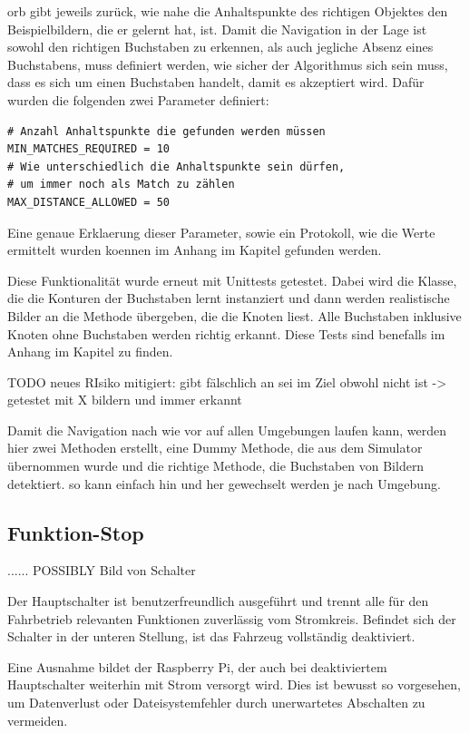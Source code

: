 \acrshort{orb} gibt jeweils zurück, wie nahe die Anhaltspunkte des richtigen Objektes den Beispielbildern, die er gelernt hat, ist. Damit die Navigation in der Lage ist sowohl den richtigen Buchstaben zu erkennen, als auch jegliche Absenz eines Buchstabens, muss definiert werden, wie sicher der Algorithmus sich sein muss, dass es sich um einen Buchstaben handelt, damit es akzeptiert wird. Dafür wurden die folgenden zwei Parameter definiert:
\begin{verbatim}
# Anzahl Anhaltspunkte die gefunden werden müssen
MIN_MATCHES_REQUIRED = 10
# Wie unterschiedlich die Anhaltspunkte sein dürfen,
# um immer noch als Match zu zählen
MAX_DISTANCE_ALLOWED = 50
\end{verbatim}

Eine genaue Erklaerung dieser Parameter, sowie ein Protokoll, wie die Werte ermittelt wurden koennen im Anhang im Kapitel  gefunden werden.

Diese Funktionalität wurde erneut mit Unittests getestet.
Dabei wird die Klasse, die die Konturen der Buchstaben lernt instanziert und dann werden realistische Bilder an die Methode übergeben, die die Knoten liest. Alle Buchstaben inklusive Knoten ohne Buchstaben werden richtig erkannt. Diese Tests sind benefalls im Anhang im Kapitel  zu finden.


TODO neues RIsiko mitigiert: gibt fälschlich an sei im Ziel obwohl nicht ist -> getestet mit X bildern und immer erkannt

Damit die Navigation nach wie vor auf allen Umgebungen laufen kann, werden hier zwei Methoden erstellt, eine Dummy Methode, die aus dem Simulator übernommen wurde und die richtige Methode, die Buchstaben von Bildern detektiert. so kann einfach hin und her gewechselt werden je nach Umgebung.


\newpage
\subsection{Funktion-Stop}

...... POSSIBLY Bild von Schalter

Der Hauptschalter ist benutzerfreundlich ausgeführt und trennt alle für den Fahrbetrieb relevanten Funktionen zuverlässig vom Stromkreis. Befindet sich der Schalter in der unteren Stellung, ist das Fahrzeug vollständig deaktiviert.

Eine Ausnahme bildet der Raspberry Pi, der auch bei deaktiviertem Hauptschalter weiterhin mit Strom versorgt wird. Dies ist bewusst so vorgesehen, um Datenverlust oder Dateisystemfehler durch unerwartetes Abschalten zu vermeiden.

